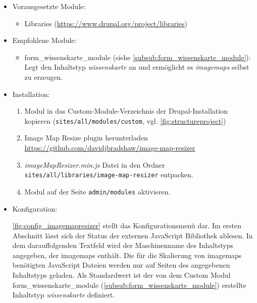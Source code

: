 \begin{itemize}[parsep=0pt, itemsep=5.0pt plus 2.0pt minus 1.0pt, leftmargin=*]
	\item Vorausgesetzte Module:

	\begin{itemize}
		\item Libraries (\url{https://www.drupal.org/project/libraries})
	\end{itemize}


	\item Empfohlene Module:

	\begin{itemize}
		\item form\_wissenskarte\_module (siehe \cref{subsub:form_wissenskarte_module}): Legt den Inhaltstyp \textit{wissenskarte} an und ermöglicht es \textit{\glspl{imagemap}} selbst zu erzeugen.
	\end{itemize}

	\item Installation:
	\begin{enumerate}
		\item Modul in das Custom-Module-Verzeichnis der Drupal-Installation kopieren  (\zB \lstinline|sites/all/modules/custom|, vgl. \cref{fig:structureproject})
		\item Image Map Resize plugin herunterladen \url{https://github.com/davidjbradshaw/image-map-resizer}
		\item \textit{imageMapResizer.min.js} Datei in den Ordner \lstinline|sites/all/libraries/image-map-resizer| entpacken.
		\item Modul auf der Seite \lstinline|admin/modules| aktivieren.
	\end{enumerate}


	\item Konfiguration:

	\cref{fig:config_imagemapresizer} stellt das Konfigurationsmenü dar. Im ersten Abschnitt lässt sich der Status der externen JavaScript Bibliothek ablesen. In dem darauffolgenden Textfeld wird der Maschinenname des Inhaltstyps angegeben, der \glspl{imagemap} enthält. Die für die Skalierung von \glspl{imagemap} benötigten JavaScript Dateien werden nur auf Seiten des angegebenen Inhaltstyps geladen. Als Standardwert ist der von dem Custom Modul form\_wissenskarte\_module (\cref{subsub:form_wissenskarte_module}) erstellte Inhaltstyp \textit{wissenskarte} definiert.

\end{itemize}



